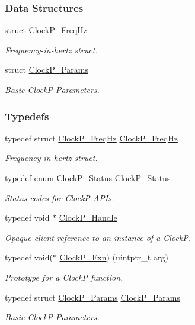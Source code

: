 \subsubsection*{Data Structures}
\begin{DoxyCompactItemize}
\item 
struct \hyperlink{struct_clock_p___freq_hz}{Clock\+P\+\_\+\+Freq\+Hz}
\begin{DoxyCompactList}\small\item\em Frequency-\/in-\/hertz struct. \end{DoxyCompactList}\item 
struct \hyperlink{struct_clock_p___params}{Clock\+P\+\_\+\+Params}
\begin{DoxyCompactList}\small\item\em Basic Clock\+P Parameters. \end{DoxyCompactList}\end{DoxyCompactItemize}
\subsubsection*{Typedefs}
\begin{DoxyCompactItemize}
\item 
typedef struct \hyperlink{struct_clock_p___freq_hz}{Clock\+P\+\_\+\+Freq\+Hz} \hyperlink{_clock_p_8h_a25fc160d58d458b85ec41dea37eaf902}{Clock\+P\+\_\+\+Freq\+Hz}
\begin{DoxyCompactList}\small\item\em Frequency-\/in-\/hertz struct. \end{DoxyCompactList}\item 
typedef enum \hyperlink{_clock_p_8h_aa2030f172fe0c2dbc9ac0b082933c767}{Clock\+P\+\_\+\+Status} \hyperlink{_clock_p_8h_ae1edd74163efee26d095e9a3d37f5a05}{Clock\+P\+\_\+\+Status}
\begin{DoxyCompactList}\small\item\em Status codes for Clock\+P A\+P\+Is. \end{DoxyCompactList}\item 
typedef void $\ast$ \hyperlink{_clock_p_8h_a003dd74e948999fe5c3f45d8f51501f1}{Clock\+P\+\_\+\+Handle}
\begin{DoxyCompactList}\small\item\em Opaque client reference to an instance of a Clock\+P. \end{DoxyCompactList}\item 
typedef void($\ast$ \hyperlink{_clock_p_8h_af516e3c763bec8fb9769ecc4ac7296bb}{Clock\+P\+\_\+\+Fxn}) (uintptr\+\_\+t arg)
\begin{DoxyCompactList}\small\item\em Prototype for a Clock\+P function. \end{DoxyCompactList}\item 
typedef struct \hyperlink{struct_clock_p___params}{Clock\+P\+\_\+\+Params} \hyperlink{_clock_p_8h_a5c7625ee9fd43a5753a76382f81ca0eb}{Clock\+P\+\_\+\+Params}
\begin{DoxyCompactList}\small\item\em Basic Clock\+P Parameters. \end{DoxyCompactList}\end{DoxyCompactItemize}
